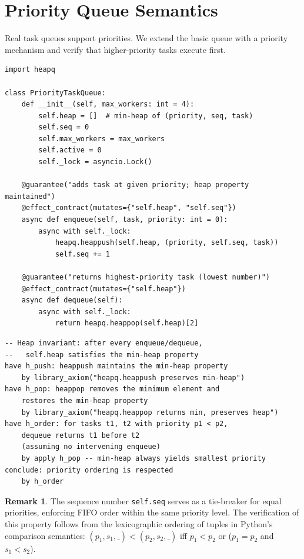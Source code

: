 \documentclass[11pt,a4paper]{report}
\theoremstyle{definition}
\newtheorem{remark}[definition]{Remark}
\theoremstyle{plain}
\begin{document}
\section{Priority Queue Semantics}

Real task queues support priorities.  We extend the basic queue with a
priority mechanism and verify that higher-priority tasks execute first.

\begin{lstlisting}[style=synhopy]
import heapq

class PriorityTaskQueue:
    def __init__(self, max_workers: int = 4):
        self.heap = []  # min-heap of (priority, seq, task)
        self.seq = 0
        self.max_workers = max_workers
        self.active = 0
        self._lock = asyncio.Lock()

    @guarantee("adds task at given priority; heap property maintained")
    @effect_contract(mutates={"self.heap", "self.seq"})
    async def enqueue(self, task, priority: int = 0):
        async with self._lock:
            heapq.heappush(self.heap, (priority, self.seq, task))
            self.seq += 1

    @guarantee("returns highest-priority task (lowest number)")
    @effect_contract(mutates={"self.heap"})
    async def dequeue(self):
        async with self._lock:
            return heapq.heappop(self.heap)[2]
\end{lstlisting}

\begin{lstlisting}[style=proof]
-- Heap invariant: after every enqueue/dequeue,
--   self.heap satisfies the min-heap property
have h_push: heappush maintains the min-heap property
    by library_axiom("heapq.heappush preserves min-heap")
have h_pop: heappop removes the minimum element and
    restores the min-heap property
    by library_axiom("heapq.heappop returns min, preserves heap")
have h_order: for tasks t1, t2 with priority p1 < p2,
    dequeue returns t1 before t2
    (assuming no intervening enqueue)
    by apply h_pop -- min-heap always yields smallest priority
conclude: priority ordering is respected
    by h_order
\end{lstlisting}

\begin{remark}
The sequence number \lstinline[style=python]{self.seq} serves as a
tie-breaker for equal priorities, enforcing FIFO order within the same
priority level.  The verification of this property follows from the
lexicographic ordering of tuples in Python's comparison semantics:
$(p_1, s_1, \_) < (p_2, s_2, \_)$ iff $p_1 < p_2$ or ($p_1 = p_2$ and
$s_1 < s_2$).
\end{remark}
\end{document}
